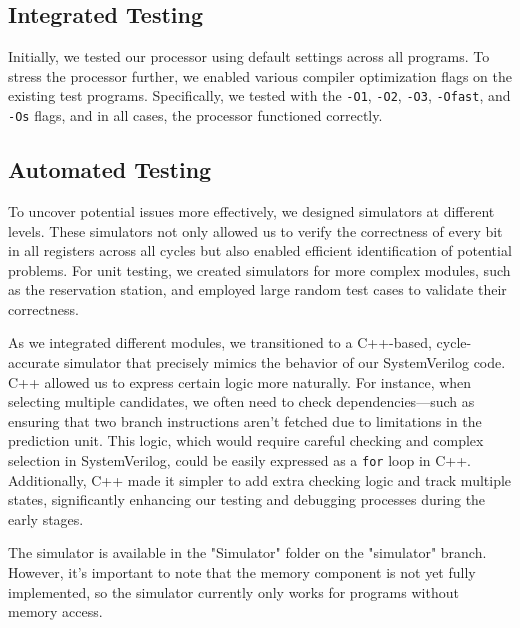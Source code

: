 
\subsection{Integrated Testing}

Initially, we tested our processor using default settings across all programs. To stress the processor further, we enabled various compiler optimization flags on the existing test programs. Specifically, we tested with the \texttt{-O1}, \texttt{-O2}, \texttt{-O3}, \texttt{-Ofast}, and \texttt{-Os} flags, and in all cases, the processor functioned correctly.

\subsection{Automated Testing}

To uncover potential issues more effectively, we designed simulators at different levels. These simulators not only allowed us to verify the correctness of every bit in all registers across all cycles but also enabled efficient identification of potential problems. For unit testing, we created simulators for more complex modules, such as the reservation station, and employed large random test cases to validate their correctness. 

As we integrated different modules, we transitioned to a C++-based, cycle-accurate simulator that precisely mimics the behavior of our SystemVerilog code. C++ allowed us to express certain logic more naturally. For instance, when selecting multiple candidates, we often need to check dependencies—such as ensuring that two branch instructions aren't fetched due to limitations in the prediction unit. This logic, which would require careful checking and complex selection in SystemVerilog, could be easily expressed as a \texttt{for} loop in C++. Additionally, C++ made it simpler to add extra checking logic and track multiple states, significantly enhancing our testing and debugging processes during the early stages.

The simulator is available in the "Simulator" folder on the "simulator" branch. However, it's important to note that the memory component is not yet fully implemented, so the simulator currently only works for programs without memory access.